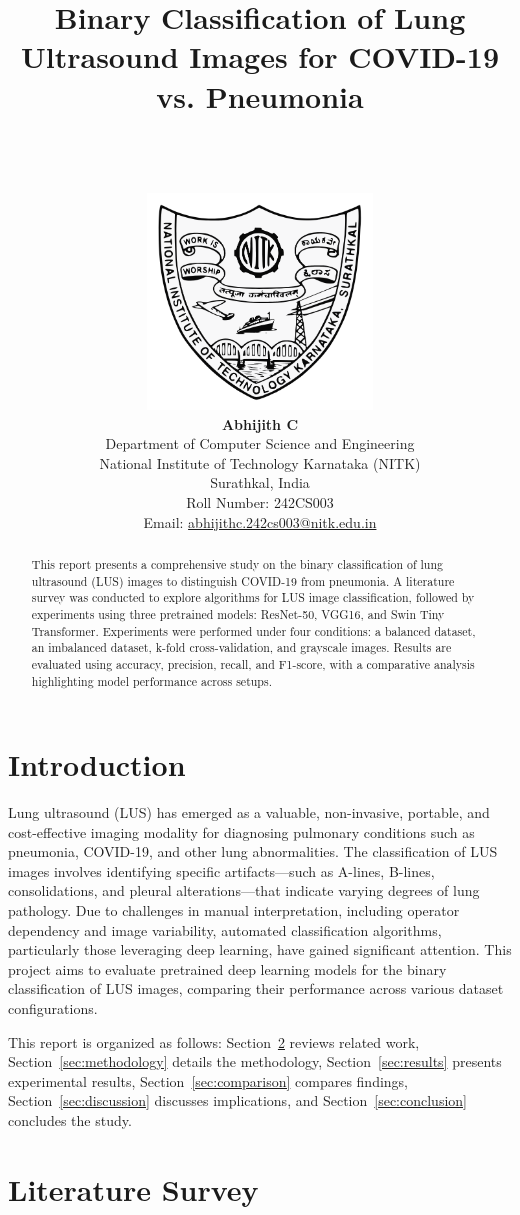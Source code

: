 \documentclass[12pt, a4paper]{article}
\title{Binary Classification of Lung Ultrasound Images for COVID-19 vs. Pneumonia}
\author{
\\
\\
\\
\includegraphics[width=6cm]{img/emblem.png}\\[2cm]
    \textbf{Abhijith C} \\
    Department of Computer Science and Engineering \\
    National Institute of Technology Karnataka (NITK) \\ 
    Surathkal, India \\
    Roll Number: 242CS003 \\ 
    Email: \href{mailto:abhijithc.242cs003@nitk.edu.in}{abhijithc.242cs003@nitk.edu.in}\\[0.5cm]
}
\date{}
\begin{document}
\maketitle
\newpage
\tableofcontents

\newpage
\begin{abstract}
This report presents a comprehensive study on the binary classification of lung ultrasound (LUS) images to distinguish COVID-19 from pneumonia. A literature survey was conducted to explore algorithms for LUS image classification, followed by experiments using three pretrained models: ResNet-50, VGG16, and Swin Tiny Transformer. Experiments were performed under four conditions: a balanced dataset, an imbalanced dataset, k-fold cross-validation, and grayscale images. Results are evaluated using accuracy, precision, recall, and F1-score, with a comparative analysis highlighting model performance across setups.
\end{abstract}

\section{Introduction}
\label{sec:introduction}
Lung ultrasound (LUS) has emerged as a valuable, non-invasive, portable, and cost-effective imaging modality for diagnosing pulmonary conditions such as pneumonia, COVID-19, and other lung abnormalities. The classification of LUS images involves identifying specific artifacts—such as A-lines, B-lines, consolidations, and pleural alterations—that indicate varying degrees of lung pathology. Due to challenges in manual interpretation, including operator dependency and image variability, automated classification algorithms, particularly those leveraging deep learning, have gained significant attention. This project aims to evaluate pretrained deep learning models for the binary classification of LUS images, comparing their performance across various dataset configurations.

This report is organized as follows: Section~\ref{sec:literature} reviews related work, Section~\ref{sec:methodology} details the methodology, Section~\ref{sec:results} presents experimental results, Section~\ref{sec:comparison} compares findings, Section~\ref{sec:discussion} discusses implications, and Section~\ref{sec:conclusion} concludes the study.

\section{Literature Survey}
\label{sec:literature}
\end{document}
